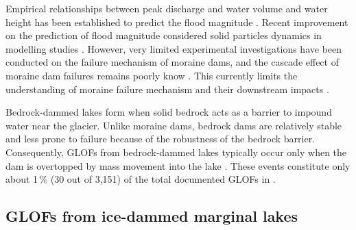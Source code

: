 
Empirical relationships between peak discharge and water volume and water height has been established to predict the flood magnitude \citep[see][for a review on moraine-dammed lake failure]{Neupane&al2019}. Recent improvement on the prediction of flood magnitude considered solid particles dynamics in modelling studies \citep[e.g.][]{Mergili&al2018}. However, very limited experimental investigations have been conducted on the failure mechanism of moraine dams, and the cascade effect of moraine dam failures remains poorly know \citep{Somos-Valenzuela&al2016}. This currently limits the understanding of moraine failure mechanism and their downstream impacts \citep{Neupane&al2019}. 





Bedrock-dammed lakes form when solid bedrock acts as a barrier to impound water near the glacier. Unlike moraine dams, bedrock dams are relatively stable and less prone to failure because of the robustness of the bedrock barrier. Consequently, GLOFs from bedrock-dammed lakes typically occur only when the dam is overtopped by mass movement into the lake \citep{Emmer2017, Huggel&al2004, Haeberli&al2017}. These events constitute only about 1\,\% (30 out of 3,151) of the total documented GLOFs in \cite{Lutzow&al2023}.


\subsection{GLOFs from ice-dammed marginal lakes}


